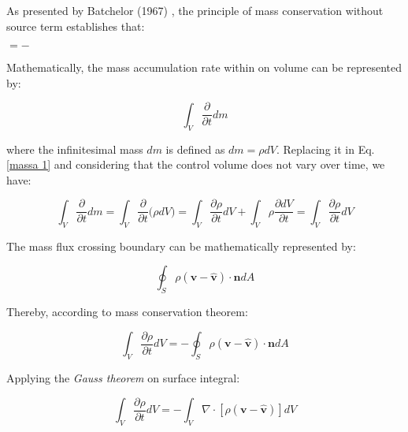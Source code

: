 As presented by Batchelor (1967) \cite{batchelor1967},
 the principle of mass conservation without source term
 establishes that:


\medskip
\begin{center}
           $= -$ 
\end{center}

\noindent Mathematically, the mass accumulation rate within on volume
 can be represented by:

\begin{equation} \label{massa 1} 
 \int_{V} \frac{\partial}{\partial t} dm
\end{equation}


\noindent where the infinitesimal mass $dm$ is defined
 as $dm = \rho dV$. Replacing it in Eq. \ref{massa 1}
 and considering that the control volume does not vary over time,
 we have:

\begin{equation}
 \int_{V} \frac{\partial}{\partial t} dm
 =
 \int_{V} \frac{\partial}{\partial t} \big( \rho dV \big)
 = 
 \int_{V} \frac{\partial \rho}{\partial t} dV
 +
 \int_{V} \rho \frac{\partial dV}{\partial t}
 = 
 \int_{V} \frac{\partial \rho}{\partial t} dV
\end{equation}

\medskip
\noindent The mass flux crossing boundary can be mathematically represented by:


\begin{equation}  
 \oint_{S} \rho \left(\textbf{v} - \hat{\textbf{v}}\right) \cdot \textbf{n} dA
\end{equation}

\medskip
\noindent Thereby, according to mass conservation theorem:

\begin{equation}
 \int_{V} \frac{\partial \rho}{\partial t} dV
 = - 
 \oint_{S} \rho \left(\textbf{v} - \hat{\textbf{v}}\right) \cdot \textbf{n} dA
\end{equation}

\medskip
\noindent Applying the \textit{Gauss theorem} on surface integral:

\begin{equation}
 \int_{V} \frac{\partial \rho}{\partial t} dV
 = - 
 \int_{V} \nabla \cdot \left[ \rho \left(\textbf{v} - \hat{\textbf{v}}\right) \right] dV
\end{equation}


